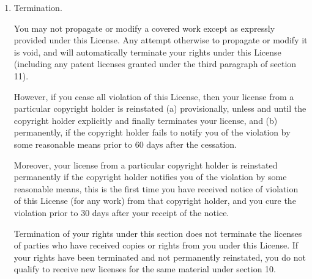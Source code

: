 \documentclass[11pt]{article}
\begin{document}
\begin{enumerate}
All other non-permissive additional terms are considered ``further
restrictions'' within the meaning of section 10.  If the Program as you
received it, or any part of it, contains a notice stating that it is
governed by this License along with a term that is a further
restriction, you may remove that term.  If a license document contains
a further restriction but permits relicensing or conveying under this
License, you may add to a covered work material governed by the terms
of that license document, provided that the further restriction does
not survive such relicensing or conveying.

If you add terms to a covered work in accord with this section, you
must place, in the relevant source files, a statement of the
additional terms that apply to those files, or a notice indicating
where to find the applicable terms.

Additional terms, permissive or non-permissive, may be stated in the
form of a separately written license, or stated as exceptions;
the above requirements apply either way.

\item Termination.

You may not propagate or modify a covered work except as expressly
provided under this License.  Any attempt otherwise to propagate or
modify it is void, and will automatically terminate your rights under
this License (including any patent licenses granted under the third
paragraph of section 11).

However, if you cease all violation of this License, then your
license from a particular copyright holder is reinstated (a)
provisionally, unless and until the copyright holder explicitly and
finally terminates your license, and (b) permanently, if the copyright
holder fails to notify you of the violation by some reasonable means
prior to 60 days after the cessation.

Moreover, your license from a particular copyright holder is
reinstated permanently if the copyright holder notifies you of the
violation by some reasonable means, this is the first time you have
received notice of violation of this License (for any work) from that
copyright holder, and you cure the violation prior to 30 days after
your receipt of the notice.

Termination of your rights under this section does not terminate the
licenses of parties who have received copies or rights from you under
this License.  If your rights have been terminated and not permanently
reinstated, you do not qualify to receive new licenses for the same
material under section 10.


\end{enumerate}
\end{document}
